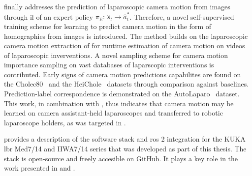 \textbf{} finally addresses the prediction of laparoscopic camera motion from images through \gls{il} of an expert policy $\pi_\text{E}:\, \hat{s}_t \rightarrow \hat{a}^*_t$. Therefore, a novel self-supervised training scheme for learning to predict camera motion in the form of homographies from images is introduced. The method builds on the laparoscopic camera motion extraction of  for runtime estimation of camera motion on videos of laparoscopic inverventions. A novel sampling scheme for camera motion importance sampling on vast databases of laparscopic interventions is contributed. Early signs of camera motion predictions capabilites are found on the Cholec80~\cite{twinanda2016endonet} and the HeiChole~\cite{maier2020heidelberg} datasets through comparison against baselines. Prediction-label correspondence is demonstrated on the AutoLaparo~\cite{wang2022autolaparo} dataset. This work, in combination with , thus indicates that camera motion may be learned on camera assistant-held laparoscopes and transferred to robotic laparoscope holders, as was targeted in .

\textbf{} provides a description of the software stack and \gls{ros} 2 integration for the KUKA \gls{lbr} Med7/14 and IIWA7/14 series that was developed as part of this thesis. The stack is open-source and freely accesible on \href{https://github.com/lbr-stack/}{GitHub}. It plays a key role in the work presented in  and .







